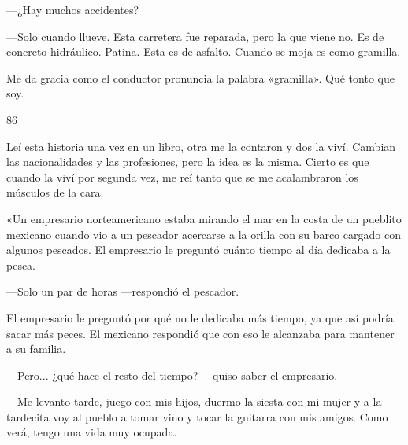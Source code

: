 \documentclass[12pt,twoside,openright,a5paper]{book}
\begin{document}
\nopagebreak

\vspace{0.5cm}

\nopagebreak

---¿Hay muchos accidentes?

---Solo cuando llueve. Esta carretera fue reparada, pero la que viene no. Es
de concreto hidráulico. Patina. Esta es de asfalto. Cuando se moja es
como gramilla.

Me da gracia como el conductor pronuncia la palabra «gramilla».
Qué tonto que soy.

\vspace{0.5cm}

\hrulefill \hspace{0.1cm}\decofourleft\hspace{0.2cm} 86 \hspace{0.2cm}\decofourright \hspace{0.1cm}\hrulefill

\nopagebreak

\vspace{0.5cm}

\nopagebreak

Leí esta historia una vez en un libro, otra me la contaron y dos
la viví. Cambian las nacionalidades y las profesiones, pero la idea
es la misma. Cierto es que cuando la viví por segunda vez, me reí tanto
que se me acalambraron los músculos de la cara.

«Un empresario norteamericano estaba mirando el mar en la costa de un
pueblito mexicano cuando vio a un pescador acercarse a la orilla con
su barco cargado con algunos pescados. El empresario le preguntó cuánto
tiempo al día dedicaba a la pesca. 

---Solo un par de horas ---respondió el pescador. 

El empresario le preguntó por qué no le dedicaba más tiempo,
ya que así podría sacar más peces. El mexicano respondió que con eso
le alcanzaba para mantener a su familia. 

---Pero... ¿qué hace el resto del tiempo? ---quiso saber el empresario. 

---Me levanto tarde, juego con mis hijos,
duermo la siesta con mi mujer y a la tardecita voy al pueblo a tomar vino
y tocar la guitarra con mis amigos. Como verá, tengo una vida muy ocupada.
\end{document}
